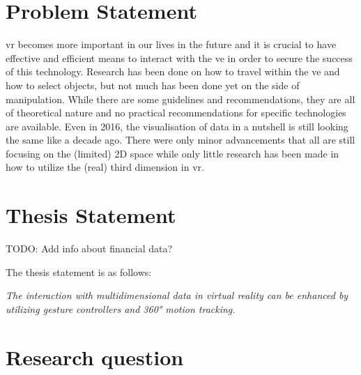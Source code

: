 
\section{Problem Statement}

\gls{vr} becomes more important in our lives in the future and it is crucial to have effective and efficient means to interact with the \gls{ve} in order to secure the success of this technology. Research has been done on how to travel within the \gls{ve} and how to select objects, but not much has been done yet on the side of manipulation. While there are some guidelines and recommendations, they are all of theoretical nature and no practical recommendations for specific technologies are available. \newline
Even in 2016, the visualisation of data in a nutshell is still looking the same like a decade ago. There were only minor advancements that all are still focusing on the (limited) 2D space while only little research has been made in how to utilize the (real) third dimension in \gls{vr}.



\section{Thesis Statement}

TODO: Add info about financial data?

The thesis statement is as follows:
\begin{framed}
	\textit{The interaction with multidimensional data in virtual reality can be enhanced by utilizing gesture controllers and 360° motion tracking.}
\end{framed} \label{TS}



\section{Research question}

